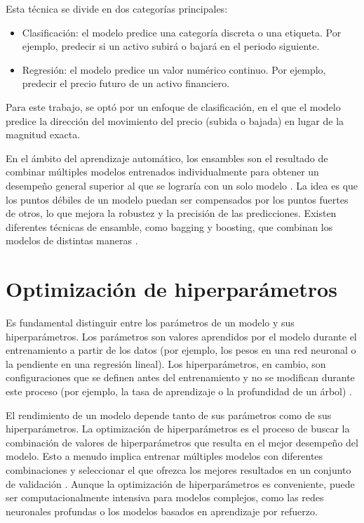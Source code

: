 Esta técnica se divide en dos categorías principales:

\begin{itemize}
\item Clasificación: el modelo predice una categoría discreta o una etiqueta. Por ejemplo, predecir si un activo subirá o bajará en el periodo siguiente.
\item Regresión: el modelo predice un valor numérico continuo. Por ejemplo, predecir el precio futuro de un activo financiero.
\end{itemize}

Para este trabajo, se optó por un enfoque de clasificación, en el que el modelo predice la dirección del movimiento del precio (subida o bajada) en lugar de la magnitud exacta.

En el ámbito del aprendizaje automático, los ensambles son el resultado de combinar múltiples modelos entrenados individualmente para obtener un desempeño general superior al que se lograría con un solo modelo \cite{Singhal:2020}. La idea es que los puntos débiles de un modelo puedan ser compensados por los puntos fuertes de otros, lo que mejora la robustez y la precisión de las predicciones. Existen diferentes técnicas de ensamble, como bagging y boosting, que combinan los modelos de distintas maneras \cite{Singhal:2020}.

\section{Optimización de hiperparámetros}

Es fundamental distinguir entre los parámetros de un modelo y sus hiperparámetros. Los parámetros son valores aprendidos por el modelo durante el entrenamiento a partir de los datos (por ejemplo, los pesos en una red neuronal o la pendiente en una regresión lineal). Los hiperparámetros, en cambio, son configuraciones que se definen antes del entrenamiento y no se modifican durante este proceso (por ejemplo, la tasa de aprendizaje o la profundidad de un árbol) \cite{Jansen:2020}.

El rendimiento de un modelo depende tanto de sus parámetros como de sus hiperparámetros. La optimización de hiperparámetros es el proceso de buscar la combinación de valores de hiperparámetros que resulta en el mejor desempeño del modelo. Esto a menudo implica entrenar múltiples modelos con diferentes combinaciones y seleccionar el que ofrezca los mejores resultados en un conjunto de validación \cite{Jansen:2020}. Aunque la optimización de hiperparámetros es conveniente, puede ser computacionalmente intensiva para modelos complejos, como las redes neuronales profundas o los modelos basados en aprendizaje por refuerzo.


